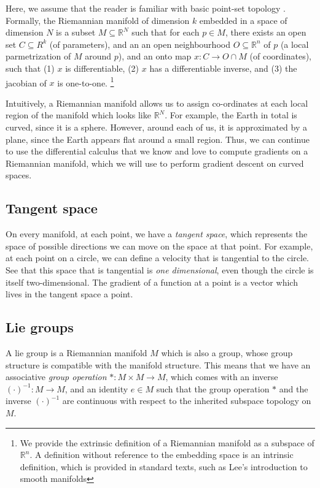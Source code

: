 \documentclass[11pt]{book}
\newcommand{\R}{\ensuremath{\mathbb R}}
\begin{document}

Here, we assume that the reader is familiar with basic point-set topology \cite{munkres2014topology}.
Formally, the Riemannian manifold of dimension $k$ embedded in a space of dimension $N$
is a subset $M \subseteq \R^N$ such that for each $p \in M$,
there exists an open set $C \subseteq R^k$ (of parameters), and an
an open neighbourhood $O \subseteq \mathbb R^n$ of $p$ (a local parmetrization of $M$ around $p$),
and an onto map $x: C \rightarrow O \cap M$ (of coordinates), such that (1) $x$ is differentiable,
(2) $x$ has a differentiable inverse, and (3) the jacobian of $x$ is one-to-one.
\footnote{We provide the extrinsic definition of a Riemannian manifold as a
subspace of $\mathbb R^n$.  A definition without reference to the embedding
space is an intrinsic definition, which is provided in standard texts, such as
Lee's introduction to smooth manifolds}

Intuitively, a Riemannian manifold allows us to assign co-ordinates at each
local region of the manifold which looks like $\R^N$. For example, the Earth in
total is curved, since it is a sphere. However, around each of us, it is
approximated by a plane, since the Earth appears flat around a small region.
Thus, we can continue to use the differential calculus that we know and love to
compute gradients on a Riemannian manifold, which we will use to perform gradient
descent on curved spaces.

\subsection{Tangent space}
On every manifold, at each point, we have a \emph{tangent space}, which
represents the space of possible directions we can move on the space at that
point. For example, at each point on a circle, we can define a velocity that is
tangential to the circle. See that this space that is tangential is \emph{one dimensional},
even though the circle is itself two-dimensional. The gradient of a function at a point is a
vector which lives in the tangent space a point.



\subsection{Lie groups}
A lie group is a Riemannian manifold $M$ which is also a group, whose group
structure is compatible with the manifold structure. This means that we have
an associative \emph{group operation} $*: M \times M \rightarrow M$, which comes with an
inverse $(\cdot)^{-1} : M \rightarrow M$, and an identity $e \in M$ such that the group operation $*$
and the inverse $(\cdot)^{-1}$ are continuous with respect to the inherited
subspace topology on $M$.
\end{document}
